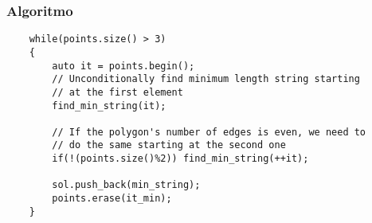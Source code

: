 \documentclass[compress]{beamer}
\begin{document}
\begin{frame}[fragile]
	\frametitle{Algoritmo}
	\begin{lstlisting}
	while(points.size() > 3)
	{
		auto it = points.begin();
		// Unconditionally find minimum length string starting
		// at the first element
		find_min_string(it);
	
		// If the polygon's number of edges is even, we need to
		// do the same starting at the second one
		if(!(points.size()%2)) find_min_string(++it);
	
		sol.push_back(min_string);
		points.erase(it_min);
	}
	\end{lstlisting}
	
\end{frame}
\end{document}
